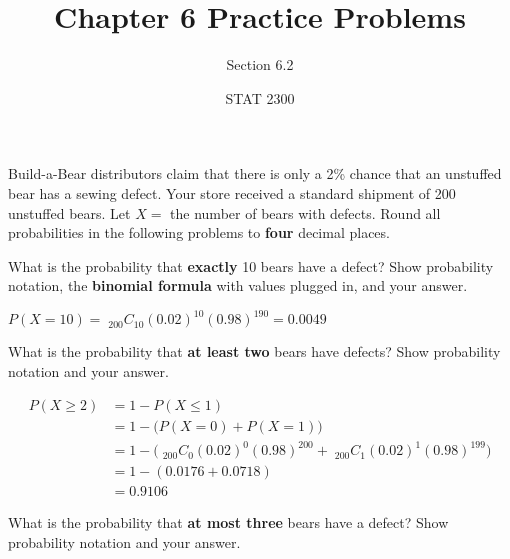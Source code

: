 \documentclass[noanswers]{exam}
\title{Chapter 6 Practice Problems}
\author{Section 6.2}
\date{STAT 2300}
\begin{document}
%


\noindent Build-a-Bear distributors claim that there is only a 2\% chance that an unstuffed bear has a sewing defect. Your store received a standard shipment of 200 unstuffed bears. Let $X=$ the number of bears with defects. Round all probabilities in the following problems to \textbf{four} decimal places.
	
	\vspace{3mm}

\begin{questions} 
		
	\question What is the probability that \textbf{exactly} 10 bears have a defect? Show probability notation, the \textbf{binomial formula} with values plugged in, and your answer.
	
	\begin{solution}[\stretch{1}]
	
	\vspace{2mm}

	$P(X=10)=\phantom{!}_{200}C_{10}(0.02)^{10}(0.98)^{190}=0.0049$
	
	\vspace{2mm}

	\end{solution}	
	
	\question What is the probability that \textbf{at least two} bears have defects? Show probability notation and your answer.
	
	\begin{solution}[\stretch{1}]	
	\begin{align*}
	P(X\geq 2) &= 1-P(X\leq 1) \\
	&= 1-\Big(P(X=0)+P(X=1)\Big)\\
	&= 1-\Big(\phantom{!}_{200}C_{0}(0.02)^0(0.98)^{200}+\phantom{!}_{200}C_{1}(0.02)^1(0.98)^{199}\Big)\\
	&= 1 - (0.0176 + 0.0718) \\
	&= 0.9106
	\end{align*}
	\end{solution}	
	
	\question What is the probability that \textbf{at most three} bears have a defect? Show probability notation and your answer.
	
	\begin{solution}[\stretch{1}]
	

\end{solution}
\end{questions}
\end{document}
